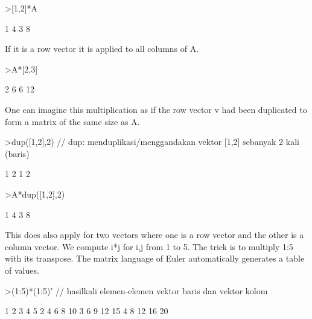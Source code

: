 \documentclass{article}
\begin{document}
\begin{eulernotebook}
\begin{eulercomment}
\begin{eulercomment}
\begin{eulercomment}
\begin{eulercomment}
\begin{eulerprompt}
>[1,2]*A
\end{eulerprompt}
\begin{euleroutput}
              1             4 
              3             8 
\end{euleroutput}
\begin{eulercomment}
If it is a row vector it is applied to all columns of A.
\end{eulercomment}
\begin{eulerprompt}
>A*[2,3]
\end{eulerprompt}
\begin{euleroutput}
              2             6 
              6            12 
\end{euleroutput}
\begin{eulercomment}
One can imagine this multiplication as if the row vector v had been
duplicated to form a matrix of the same size as A.
\end{eulercomment}
\begin{eulerprompt}
>dup([1,2],2) // dup: menduplikasi/menggandakan vektor [1,2] sebanyak 2 kali (baris)
\end{eulerprompt}
\begin{euleroutput}
              1             2 
              1             2 
\end{euleroutput}
\begin{eulerprompt}
>A*dup([1,2],2) 
\end{eulerprompt}
\begin{euleroutput}
              1             4 
              3             8 
\end{euleroutput}
\begin{eulercomment}
This does also apply for two vectors where one is a row vector and the
other is a column vector. We compute i*j for i,j from 1 to 5. The trick is to multiply 1:5
with its transpose. The matrix language of Euler automatically
generates a table of values.
\end{eulercomment}
\begin{eulerprompt}
>(1:5)*(1:5)' // hasilkali elemen-elemen vektor baris dan vektor kolom
\end{eulerprompt}
\begin{euleroutput}
              1             2             3             4             5 
              2             4             6             8            10 
              3             6             9            12            15 
              4             8            12            16            20 

\end{euleroutput}
\end{eulercomment}
\end{eulercomment}
\end{eulercomment}
\end{eulercomment}
\end{eulernotebook}
\end{document}
